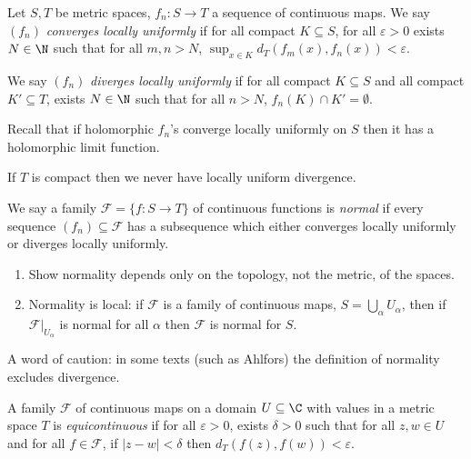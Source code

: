\documentclass[a4paper]{article}
\begin{document}
\begin{definition}
  Let \(S, T\) be metric spaces, \(f_n: S \to T\) a sequence of continuous maps. We say \((f_n)\) \emph{converges locally uniformly} if for all compact \(K \subseteq S\), for all \(\varepsilon > 0\) exists \(N \in \N\) such that for all \(m, n > N\), \(\sup_{x \in K} d_T(f_m(x), f_n(x)) < \varepsilon\).

  We say \((f_n)\) \emph{diverges locally uniformly} if for all compact \(K \subseteq S\) and all compact \(K' \subseteq T\), exists \(N \in \N\) such that for all \(n > N\), \(f_n(K) \cap K' = \emptyset\).
\end{definition}

Recall that if holomorphic \(f_n\)'s converge locally uniformly on \(S\) then it has a holomorphic limit function.

\begin{remark}
  If \(T\) is compact then we never have locally uniform divergence.
\end{remark}

\begin{definition}
  We say a family \(\mathcal F = \{f: S \to T\}\) of continuous functions is \emph{normal} if every sequence \((f_n) \subseteq \mathcal F\) has a subsequence which either converges locally uniformly or diverges locally uniformly.
\end{definition}

\begin{ex}\leavevmode
  \begin{enumerate}
  \item Show normality depends only on the topology, not the metric, of the spaces.
  \item Normality is local: if \(\mathcal F\) is a family of continuous maps, \(S = \bigcup_\alpha U_\alpha\), then if \(\mathcal F|_{U_\alpha}\) is normal for all \(\alpha\) then \(\mathcal F\) is normal for \(S\).
  \end{enumerate}
\end{ex}

A word of caution: in some texts (such as Ahlfors) the definition of normality excludes divergence.

\begin{definition}[equicontinuity]
  A family \(\mathcal F\) of continuous maps on a domain \(U \subseteq \C\) with values in a metric space \(T\) is \emph{equicontinuous} if for all \(\varepsilon > 0\), exists \(\delta > 0\) such that for all \(z, w \in U\) and for all \(f \in \mathcal F\), if \(|z - w| < \delta\) then \(d_T(f(z), f(w)) < \varepsilon\).
\end{definition}
\end{document}
